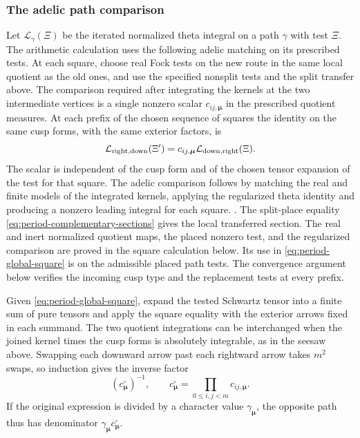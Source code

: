 \subsubsection{The adelic path comparison}
Let \(\mathcal L_\gamma(\Xi)\) be the iterated normalized theta integral
on a path \(\gamma\) with test \(\Xi\). The arithmetic calculation uses
the following adelic matching on its prescribed tests. At each square,
choose real Fock tests on the new route in the same local quotient as
the old ones, and use the specified nonsplit tests and the split
transfer above. The comparison required after integrating the kernels
at the two intermediate vertices is a single nonzero scalar
\(c_{ij,\boldsymbol\mu}\) in the prescribed quotient measures. At each prefix of the chosen sequence of squares the identity on the
same cusp forms, with the same exterior factors, is
\begin{equation}
\label{eq:period-global-square}
 \mathcal L_{\rm right,down}(\Xi')
   =c_{ij,\boldsymbol\mu}\mathcal L_{\rm down,right}(\Xi).
\end{equation}
The scalar is independent of the cusp form and of the chosen tensor
expansion of the test for that square.
The adelic comparison follows by matching the real and finite models
of the integrated kernels, applying the regularized theta identity
and producing a nonzero leading integral for each square.
.
The split-place equality \eqref{eq:period-complementary-sections}
gives the local transferred section. The real and inert
normalized quotient maps, the placed nonzero test, and the
regularized comparison are proved in the square calculation
below. Its use in \eqref{eq:period-global-square} is on the
admissible placed path tests. The convergence argument below verifies the incoming cusp type and
the replacement tests at every prefix.

Given \eqref{eq:period-global-square}, expand the tested Schwartz
tensor into a finite sum of pure tensors and apply the square equality
with the exterior arrows fixed in each summand. The two quotient
integrations can be interchanged when the joined kernel times the cusp
forms is absolutely integrable, as in the seesaw above. Swapping each
downward arrow past each rightward arrow takes \(m^2\) swaps, so
induction gives the inverse factor
\[
 (c^\square_{\boldsymbol\mu})^{-1},
 \qquad c^\square_{\boldsymbol\mu}=\prod_{0\le i,j<m}c_{ij,\boldsymbol\mu}.
\]
If the original expression is divided by a character value
\(\gamma_{\boldsymbol\mu}\), the opposite path thus has denominator
\(\gamma_{\boldsymbol\mu}c^\square_{\boldsymbol\mu}\).


